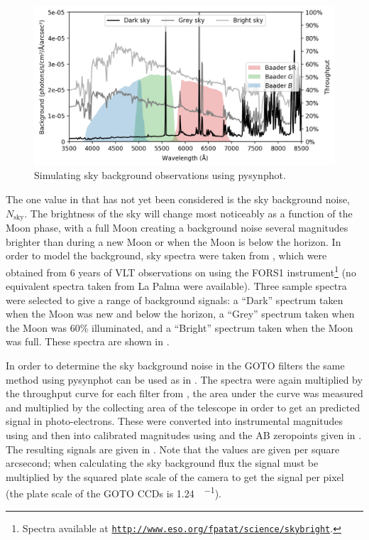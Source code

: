 \begin{colsection}
\begin{figure}[t]
    \begin{center}
        \includegraphics[width=\linewidth]{images/throughput/background.png}
    \end{center}
    \caption[Simulating sky background observations]{
        Simulating sky background observations using pysynphot.
    }\label{fig:background}
\end{figure}

The one value in  that has not yet been considered is the sky background noise, $N_\text{sky}$. The brightness of the sky will change most noticeably as a function of the Moon phase, with a full Moon creating a background noise several magnitudes brighter than during a new Moon or when the Moon is below the horizon. In order to model the background, sky spectra were taken from \citet{sky_background}, which were obtained from 6 years of VLT observations on using the FORS1 instrument\footnote{Spectra available at \href{http://www.eso.org/~fpatat/science/skybright}{\texttt{http://www.eso.org/\raisebox{0.5ex}{\texttildelow}fpatat/science/skybright}}.} (no equivalent spectra taken from La Palma were available). Three sample spectra were selected to give a range of background signals: a ``Dark'' spectrum taken when the Moon was new and below the horizon, a ``Grey'' spectrum taken when the Moon was 60\% illuminated, and a ``Bright'' spectrum taken when the Moon was full. These spectra are shown in .

In order to determine the sky background noise in the GOTO filters the same method using pysynphot can be used as in . The spectra were again multiplied by the throughput curve for each filter from , the area under the curve was measured and multiplied by the collecting area of the telescope in order to get an predicted signal in photo-electrons. These were converted into instrumental magnitudes using  and then into calibrated magnitudes using  and the AB zeropoints given in . The resulting signals are given in . Note that the values are given per square arcsecond; when calculating the sky background flux the signal must be multiplied by the squared plate scale of the camera to get the signal per pixel (the plate scale of the GOTO CCDs is \SI[per-mode=symbol]{1.24}{\arcsec\per\pixel}).


\end{colsection}
